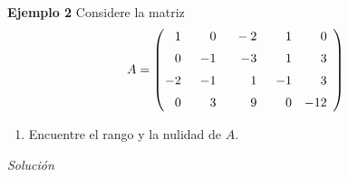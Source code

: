\begin{frame}%

\begin{ej}{\textbf{Ejemplo 2}}
	Considere la matriz
		\[
		A = 
		\left( 
		\begin{array}{@{\hspace{0.1\tabcolsep}}rrrrr}	
		 1 & \phantom{-1}0 & \phantom{1}-2 & \phantom{-1}1 & 0 \\[2mm] 
		 0 & -1 & -3 & 1 & 3 \\[2mm] 
		-2 & -1 & 1 & -1 & 3 \\[2mm] 
		 0 & 3 & 9 & 0 & -12 
		\end{array} 
		\right)
		\]
	
	\vspace{-1mm}	
	\begin{enumerate}
		\item[\labelname{$a$}] Encuentre el rango y la nulidad de $A$. \\[2mm]
	\end{enumerate}
\end{ej}
\textit{Solución}

\end{frame}


\subsection{}


